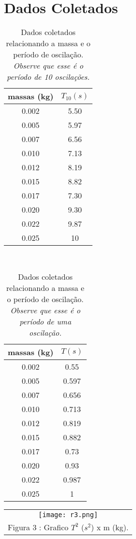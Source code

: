 \documentclass[11pt, article]{abntex2}
\begin{document}
\section{Dados Coletados}
\begin{table}[!ht]
    \centering
    \begin{tabular}{|c|c|}
    \hline
    massas (kg) & $T_{10} (s)$\\
    \hline
    0.002     &  5.50   \\
    \hline
    0.005     & 5.97\\
    \hline
    0.007 &  6.56\\
    \hline
    0.010 & 7.13\\
    \hline
    0.012 & 8.19\\
    \hline
    0.015 & 8.82\\
    \hline
    0.017 & 7.30\\
    \hline
    0.020 & 9.30\\
    \hline
    0.022 & 9.87\\
    \hline
    0.025 & 10\\
    \hline
    \end{tabular}
    \caption{Dados coletados relacionando a massa e o período de oscilação. \textit{Observe que esse é o período de 10 oscilações.}}
    \label{tab:1}
\end{table}
\\
\begin{table}[!ht]
    \centering
    \begin{tabular}{|c|c|}
    \hline
    massas (kg) & $T (s)$\\
    \hline
    0.002     &  0.55   \\
    \hline
    0.005     & 0.597\\
    \hline
    0.007 &  0.656\\
    \hline
    0.010 & 0.713\\
    \hline
    0.012 & 0.819\\
    \hline
    0.015 & 0.882\\
    \hline
    0.017 & 0.73\\
    \hline
    0.020 & 0.93\\
    \hline
    0.022 & 0.987\\
    \hline
    0.025 & 1\\
    \hline
    \end{tabular}
    \caption{Dados coletados relacionando a massa e o período de oscilação. \textit{Observe que esse é o período de uma oscilação.}}
    \label{tab:1}
\end{table}
\begin{table}[!ht]
    \centering
    \begin{tabular}{c}
    \texttt{[image: r3.png]}  \\
          Figura 3 : Grafico $T^{2}$ ($s^{2}$) x m (kg).
    \end{tabular}
    \label{fig3}
\end{table}
\\
\end{document}
